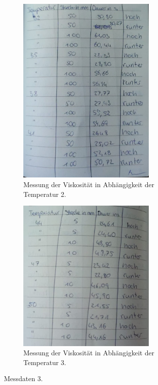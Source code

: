 \begin{figure}
  \centering
  \begin{subfigure}{0.5\textwidth}
    \centering
    \includegraphics[width=0.75\textwidth]{Temp2.jpeg}
    \caption{Messung der Viskosität in Abhängigkeit der Temperatur 2.}
  \end{subfigure}

  \begin{subfigure}{0.5\textwidth}
    \centering
    \includegraphics[width=0.75\textwidth]{Temp3.jpeg}
    \caption{Messung der Viskosität in Abhängigkeit der Temperatur 3.}
  \end{subfigure}
  \caption{Messdaten 3.}
\end{figure}
